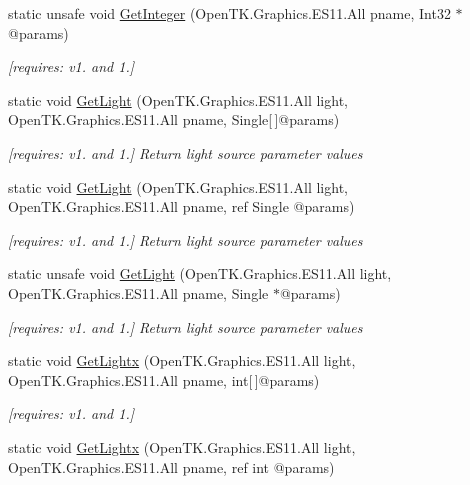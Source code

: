 \begin{DoxyCompactItemize}
static unsafe void \hyperlink{class_open_t_k_1_1_graphics_1_1_e_s11_1_1_g_l_ae38e3e5a8e9823423c1a1c5695dfbe72}{Get\-Integer} (Open\-T\-K.\-Graphics.\-E\-S11.\-All pname, Int32 $\ast$@params)
\begin{DoxyCompactList}\small\item\em \mbox{[}requires\-: v1. and 1.\mbox{]}\end{DoxyCompactList}\item 
static void \hyperlink{class_open_t_k_1_1_graphics_1_1_e_s11_1_1_g_l_a4243cab1743d770359d93880a62beafa}{Get\-Light} (Open\-T\-K.\-Graphics.\-E\-S11.\-All light, Open\-T\-K.\-Graphics.\-E\-S11.\-All pname, Single\mbox{[}$\,$\mbox{]}@params)
\begin{DoxyCompactList}\small\item\em \mbox{[}requires\-: v1. and 1.\mbox{]} Return light source parameter values \end{DoxyCompactList}\item 
static void \hyperlink{class_open_t_k_1_1_graphics_1_1_e_s11_1_1_g_l_a4672bcf075aa744367ae9c06352a7b9d}{Get\-Light} (Open\-T\-K.\-Graphics.\-E\-S11.\-All light, Open\-T\-K.\-Graphics.\-E\-S11.\-All pname, ref Single @params)
\begin{DoxyCompactList}\small\item\em \mbox{[}requires\-: v1. and 1.\mbox{]} Return light source parameter values \end{DoxyCompactList}\item 
static unsafe void \hyperlink{class_open_t_k_1_1_graphics_1_1_e_s11_1_1_g_l_adff9e1775df654f384345fdc8259e086}{Get\-Light} (Open\-T\-K.\-Graphics.\-E\-S11.\-All light, Open\-T\-K.\-Graphics.\-E\-S11.\-All pname, Single $\ast$@params)
\begin{DoxyCompactList}\small\item\em \mbox{[}requires\-: v1. and 1.\mbox{]} Return light source parameter values \end{DoxyCompactList}\item 
static void \hyperlink{class_open_t_k_1_1_graphics_1_1_e_s11_1_1_g_l_aa28d572ed41a63d31c3cfbbcd8cb126d}{Get\-Lightx} (Open\-T\-K.\-Graphics.\-E\-S11.\-All light, Open\-T\-K.\-Graphics.\-E\-S11.\-All pname, int\mbox{[}$\,$\mbox{]}@params)
\begin{DoxyCompactList}\small\item\em \mbox{[}requires\-: v1. and 1.\mbox{]}\end{DoxyCompactList}\item 
static void \hyperlink{class_open_t_k_1_1_graphics_1_1_e_s11_1_1_g_l_a2bf8f1aabfaf3815193747c44046aeba}{Get\-Lightx} (Open\-T\-K.\-Graphics.\-E\-S11.\-All light, Open\-T\-K.\-Graphics.\-E\-S11.\-All pname, ref int @params)

\end{DoxyCompactItemize}
